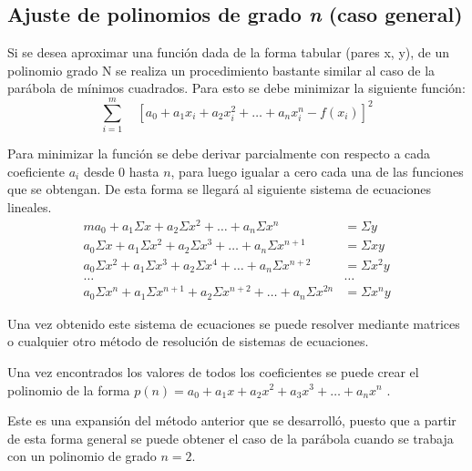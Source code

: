 \documentclass[11pt,letterpaper]{article}
\begin{document}
\subsection{Ajuste de polinomios de grado \textit{n}	 (caso general)}
Si se desea aproximar una función dada de la forma tabular (pares x, y), de un polinomio grado N se realiza un procedimiento bastante similar al caso de la parábola de mínimos cuadrados. Para esto se debe minimizar la siguiente función:
\begin{equation} \label{	equation:ajustte}
	\sum_{i=1}^{m} \quad [ a_0 + a_1x_i + a_2x_i^2 + \dots + a_nx_i^n - f(x_i)] ^ 2
\end{equation}
\par
Para minimizar la función se debe derivar parcialmente con respecto a cada coeficiente $a_i$ desde 0 hasta $n$, para luego igualar a cero cada una de las funciones que se obtengan. De esta forma se llegará al siguiente sistema de ecuaciones lineales.
\begin{align*}
	ma_0 + a_1\Sigma x + a_2\Sigma x^2 + \dots + a_n\Sigma x^n &= \Sigma y \\
	a_0\Sigma x + a_1\Sigma x^2 + a_2\Sigma x^3 + \dots + a_n\Sigma x^{n+1} &= \Sigma xy\\
	a_0\Sigma x ^2 + a_1\Sigma x^3 + a_2\Sigma x^4 + \dots + a_n\Sigma x^{n+2} &= \Sigma x^2y \\
	\dots  & \dots \\
	a_0\Sigma x^n + a_1\Sigma x^{n+1} + a_2\Sigma x^{n+2} + \dots + a_n\Sigma x^{2n} &= \Sigma  x^ny
\end{align*}
\par
Una vez obtenido este sistema de ecuaciones se puede resolver mediante matrices o cualquier otro método de resolución de sistemas de ecuaciones.
\par  Una vez encontrados los valores de todos los coeficientes se puede crear el polinomio de la forma  $p(n) = a_0 + a_1x + a_2x^2 + a_3x^3 + \dots + a_nx^n$ .
\par Este es una expansión del método anterior que se desarrolló, puesto que a partir de esta forma general se puede obtener el caso de la parábola cuando se trabaja con un polinomio de grado $n = 2$.
\cite{nieves2011metodos}




\end{document}
